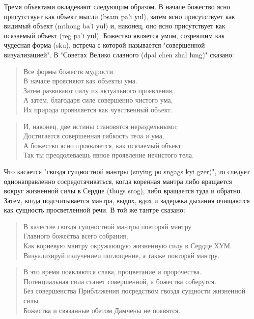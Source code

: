 Тремя объектами овладевают следующим образом. В начале божество ясно
присутствует как объект мысли (bsam pa'i уul), затем ясно присутствует как видимый объект
(mthong ba'i yul) и, наконец, оно ясно присутствует как осязаемый объект (reg pa'i yul).
Божество является умом, созревшим как чудесная форма (sku), встреча с которой называется
"совершенной визуализацией". В "Советах Велико славного (dpal chen zhal lung)" сказано:

\begin{verse}
Все формы божеств мудрости\\
В начале проясняют как объекты ума.\\
Затем развивают силу их актуального проявления,\\
А затем, благодаря силе совершенно чистого ума,\\
Их природа проявляется как чувственный объект.\\
\end{verse}

\begin{verse}
И, наконец, две истины становятся нераздельными;\\
Достигается совершенная гибкость тела и ума,\\
А божество ясно проявляется, как осязаемый объект.\\
Так ты преодолеваешь явное проявление нечистого тела.
\end{verse}

Что касается "гвоздя сущностной мантры (snying ро sngags kyi gzer)", то следует
однонаправленно сосредотачиваться, когда коренная мантра либо вращается вокруг
жизненной силы в Сердце (thugs srog), либо вращается туда и обратно. Затем, когда
подсчитывается мантра, выдох, вдох и задержка дыхания очищаются как сущность
просветленной речи. В той же тантре сказано:

\begin{verse}
В качестве гвоздя сущностной мантры повторяй мантру\\
Главного божества всего собрания,\\
Как корневую мантру окружающую жизненную силу в Сердце ХУМ.\\
Визуализируй излучениеи поглощение, а также повторяй мантру.\\
\end{verse}

\begin{verse}
В это время появляются слава, процветание и пророчества.\\
Потенциальная сила станет совершенной, а божества соберутся.\\
Без совершенства Приближения посредством гвоздя сущности жизненной силы\\
Божества и связанные обетом Дамчены не появятся.
\end{verse}

